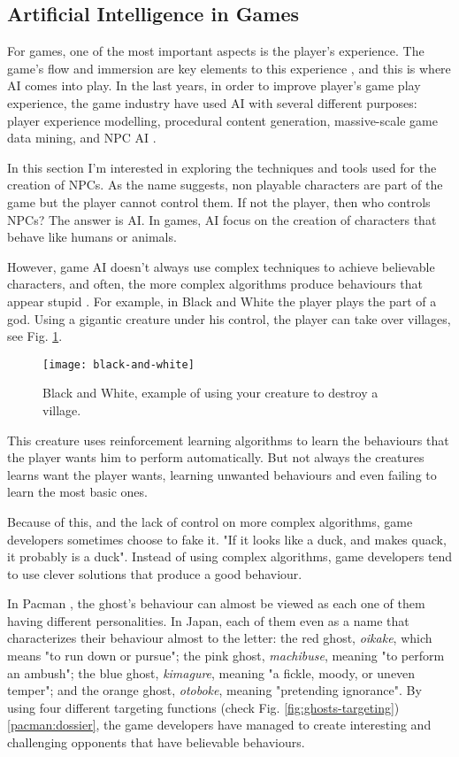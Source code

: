 \subsection{Artificial Intelligence in Games}

For games, one of the most important aspects is the player's experience.
The game's flow and immersion are key elements to this experience \cite{ijsselsteijn:userexperience}, and this is where \ac{AI} comes into play.
In the last years, in order to improve player's game play experience, the game industry have used \ac{AI} with several different purposes: player experience modelling, procedural content generation, massive-scale game data mining, and \ac{NPC} \ac{AI} \cite{yannakakis:gameairevisited}.

In this section I'm interested in exploring the techniques and tools used for the creation of \ac{NPC}s.
As the name suggests, non playable characters are part of the game but the player cannot control them.
If not the player, then who controls \ac{NPC}s?
The answer is \ac{AI}.
In games, \ac{AI} focus on the creation of characters that behave like humans or animals.

However, game \ac{AI} doesn't always use complex techniques to achieve believable characters, and often, the more complex algorithms produce behaviours that appear stupid \cite{millington:AIgames}.
For example, in Black and White \cite{game:black&white} the player plays the part of a god.
Using a gigantic creature under his control, the player can take over villages, see Fig. \ref{fig:black-and-white}.
\begin{figure}
  \centering
    \texttt{[image: black-and-white]}
  \caption{Black and White, example of using your creature to destroy a village.}
  \label{fig:black-and-white}
\end{figure}
This creature uses reinforcement learning algorithms to learn the behaviours that the player wants him to perform automatically.
But not always the creatures learns want the player wants, learning unwanted behaviours and even failing to learn the most basic ones.

Because of this, and the lack of control on more complex algorithms, game developers sometimes choose to fake it.
"If it looks like a duck, and makes quack, it probably is a duck".
Instead of using complex algorithms, game developers tend to use clever solutions that produce a good behaviour.

In Pacman \cite{game:pacman}, the ghost's behaviour can almost be viewed as each one of them having different personalities.
In Japan, each of them even as a name that characterizes their behaviour almost to the letter: the red ghost, \textit{oikake}, which means "to run down or pursue"; the pink ghost, \textit{machibuse}, meaning "to perform an ambush"; the blue ghost, \textit{kimagure}, meaning "a fickle, moody, or uneven temper"; and the orange ghost, \textit{otoboke}, meaning "pretending ignorance".
By using four different targeting functions (check Fig. \ref{fig:ghosts-targeting})\ref{pacman:dossier}, the game developers have managed to create interesting and challenging opponents that have believable behaviours.


